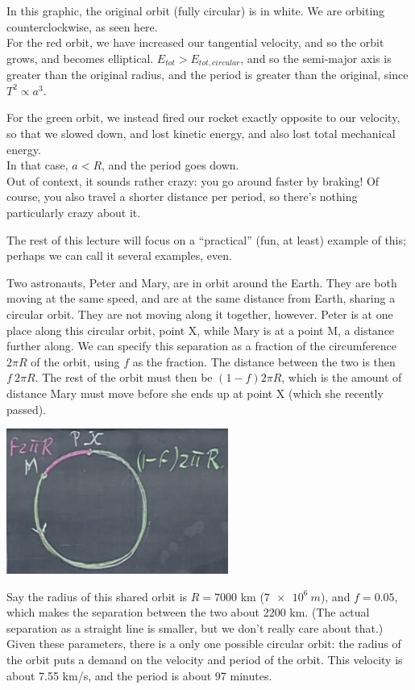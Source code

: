 \documentclass[8.01x]{subfiles}
\begin{document}
In this graphic, the original orbit (fully circular) is in white. We are orbiting counterclockwise, as seen here.\\
For the red orbit, we have increased our tangential velocity, and so the orbit grows, and becomes elliptical. $E_{tot} > E_{tot,circular}$, and so the semi-major axis is greater than the original radius, and the period is greater than the original, since $T^2 \propto a^3$.

For the green orbit, we instead fired our rocket exactly opposite to our velocity, so that we slowed down, and lost kinetic energy, and also lost total mechanical energy.\\
In that case, $a < R$, and the period goes down.\\
Out of context, it sounds rather crazy: you go around faster by braking! Of course, you also travel a shorter distance per period, so there's nothing particularly crazy about it.

The rest of this lecture will focus on a ``practical'' (fun, at least) example of this; perhaps we can call it several examples, even.

Two astronauts, Peter and Mary, are in orbit around the Earth. They are both moving at the same speed, and are at the same distance from Earth, sharing a circular orbit. They are not moving along it together, however. Peter is at one place along this circular orbit, point X, while Mary is at a point M, a distance further along. We can specify this separation as a fraction of the circumference $2 \pi R$ of the orbit, using $f$ as the fraction. The distance between the two is then $f\ 2 \pi R$. The rest of the orbit must then be $(1-f) 2 \pi R$, which is the amount of distance Mary must move before she ends up at point X (which she recently passed).

\begin{center}
\includegraphics[scale=0.6]{Graphics/lec22_peter_mary_orbit}
\end{center}

Say the radius of this shared orbit is $R = 7000$ km ($\SI{7e6}{m}$), and $f = 0.05$, which makes the separation between the two about 2200 km. (The actual separation as a straight line is smaller, but we don't really care about that.)\\
Given these parameters, there is a only one possible circular orbit: the radius of the orbit puts a demand on the velocity and period of the orbit. This velocity is about 7.55 km/s, and the period is about 97 minutes.
\end{document}
